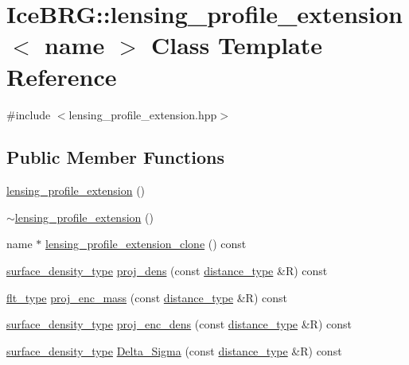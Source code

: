 \hypertarget{classIceBRG_1_1lensing__profile__extension}{}\section{Ice\+B\+R\+G\+:\+:lensing\+\_\+profile\+\_\+extension$<$ name $>$ Class Template Reference}
\label{classIceBRG_1_1lensing__profile__extension}


{\ttfamily \#include $<$lensing\+\_\+profile\+\_\+extension.\+hpp$>$}

\subsection*{Public Member Functions}
\begin{DoxyCompactItemize}
\item 
\hyperlink{classIceBRG_1_1lensing__profile__extension_adeb6f629b5ed4c1a736ff4ffc6ed2812}{lensing\+\_\+profile\+\_\+extension} ()
\item 
\hyperlink{classIceBRG_1_1lensing__profile__extension_a5107ff816ca51042158cdd4bd00674c8}{$\sim$lensing\+\_\+profile\+\_\+extension} ()
\item 
name $\ast$ \hyperlink{classIceBRG_1_1lensing__profile__extension_ac82a0292013dde065e28c0b5922727f8}{lensing\+\_\+profile\+\_\+extension\+\_\+clone} () const 
\item 
\hyperlink{namespaceIceBRG_a80c597ef5ba0a32491d32a9f0083b02d}{surface\+\_\+density\+\_\+type} \hyperlink{classIceBRG_1_1lensing__profile__extension_a304474bb2ef5d0a45bd0b916ea7d1e19}{proj\+\_\+dens} (const \hyperlink{namespaceIceBRG_a45499647eb87e24c10ab32c628711cec}{distance\+\_\+type} \&R) const 
\item 
\hyperlink{lib_2IceBRG__main_2common_8h_ad0f130a56eeb944d9ef2692ee881ecc4}{flt\+\_\+type} \hyperlink{classIceBRG_1_1lensing__profile__extension_a92acfaacb68a0c8118a41ad2e881c920}{proj\+\_\+enc\+\_\+mass} (const \hyperlink{namespaceIceBRG_a45499647eb87e24c10ab32c628711cec}{distance\+\_\+type} \&R) const 
\item 
\hyperlink{namespaceIceBRG_a80c597ef5ba0a32491d32a9f0083b02d}{surface\+\_\+density\+\_\+type} \hyperlink{classIceBRG_1_1lensing__profile__extension_a1dbac03a5d151f664be31af6d475dec8}{proj\+\_\+enc\+\_\+dens} (const \hyperlink{namespaceIceBRG_a45499647eb87e24c10ab32c628711cec}{distance\+\_\+type} \&R) const 
\item 
\hyperlink{namespaceIceBRG_a80c597ef5ba0a32491d32a9f0083b02d}{surface\+\_\+density\+\_\+type} \hyperlink{classIceBRG_1_1lensing__profile__extension_a1e90be0176ced0a03d94ba632caca497}{Delta\+\_\+\+Sigma} (const \hyperlink{namespaceIceBRG_a45499647eb87e24c10ab32c628711cec}{distance\+\_\+type} \&R) const 

\end{DoxyCompactItemize}
